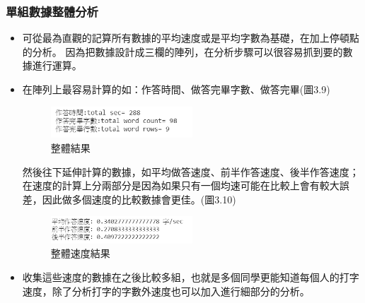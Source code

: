 \subsubsection{單組數據整體分析}
\begin{itemize}
	\item 可從最為直觀的記算所有數據的平均速度或是平均字數為基礎，在加上停頓點的分析。
	因為把數據設計成三欄的陣列，在分析步驟可以很容易抓到要的數據進行運算。
	\item 在陣列上最容易計算的如：作答時間、做答完畢字數、做答完畢(圖3.9)
	\begin{figure}[H] 
		\centering 
		\includegraphics[width=0.5\textwidth]{3_8.png} 
		\caption{整體結果} 
		\label{Fig.3.9} 
	\end{figure}
	然後往下延伸計算的數據，如平均做答速度、前半作答速度、後半作答速度；在速度的計算上分兩部分是因為如果只有一個均速可能在比較上會有較大誤差，因此做多個速度的比較數據會更佳。(圖3.10)
	\begin{figure}[H] 
		\centering 
		\includegraphics[width=0.5\textwidth]{3_9.png} 
		\caption{整體速度結果} 
		\label{Fig.3.10} 
	\end{figure}
	\item 收集這些速度的數據在之後比較多組，也就是多個同學更能知道每個人的打字速度，除了分析打字的字數外速度也可以加入進行細部分的分析。
\end{itemize}

